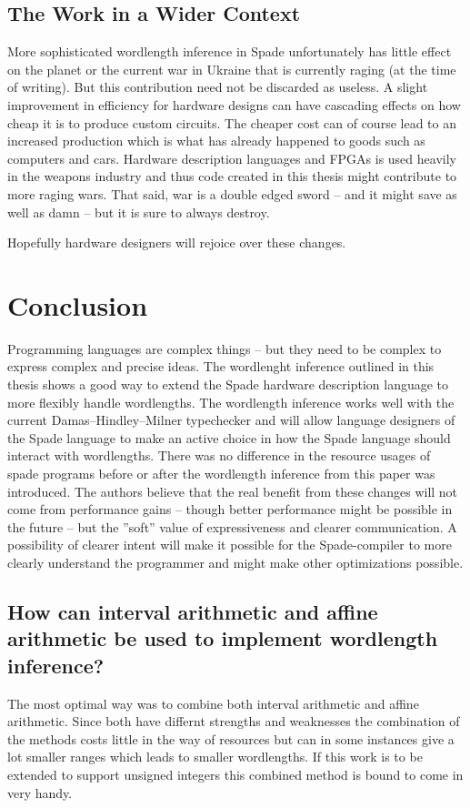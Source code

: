 \documentclass[msc,lith,english]{liuthesis}
\begin{document}
\section{The Work in a Wider Context}
More sophisticated wordlength inference in Spade unfortunately has little effect on the planet or the current war in Ukraine that is currently raging (at the time of writing). But this contribution need not be discarded as useless. A slight improvement in efficiency for hardware designs can have cascading effects on how cheap it is to produce custom circuits. The cheaper cost can of course lead to an increased production which is what has already happened to goods such as computers and cars. Hardware description languages and FPGAs is used heavily in the weapons industry and thus code created in this thesis might contribute to more raging wars. That said, war is a double edged sword -- and it might save as well as damn -- but it is sure to always destroy.

Hopefully hardware designers will rejoice over these changes.

\chapter{Conclusion}
\label{cha:Conclusion}
Programming languages are complex things -- but they need to be complex to express complex and precise ideas. The wordlenght inference outlined in this thesis shows a good way to extend the Spade hardware description language to more flexibly handle wordlengths. The wordlength inference works well with the current Damas–Hindley–Milner typechecker and will allow language designers of the Spade language to make an active choice in how the Spade language should interact with wordlengths. There was no difference in the resource usages of spade programs before or after the wordlength inference from this paper was introduced. The authors believe that the real benefit from these changes will not come from performance gains -- though better performance might be possible in the future -- but the ''soft'' value of expressiveness and clearer communication. A possibility of clearer intent will make it possible for the Spade-compiler to more clearly understand the programmer and might make other optimizations possible.


\section{How can interval arithmetic and affine arithmetic be used to implement wordlength inference?}
The most optimal way was to combine both interval arithmetic and affine arithmetic. Since both have differnt strengths and weaknesses the combination of the methods costs little in the way of resources but can in some instances give a lot smaller ranges which leads to smaller wordlengths. If this work is to be extended to support unsigned integers this combined method is bound to come in very handy. 
\end{document}
